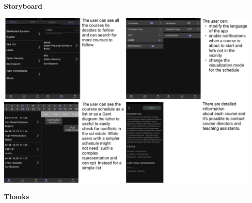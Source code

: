 \documentclass[t,aspectratio=1610]{beamer}
\begin{document}
{
\begin{frame}
\textbf{Storyboard} \\

\centerline{\includegraphics[scale=0.13]{storyboard.jpg}}
\end{frame}
}

{

\begin{frame}
\textbf{Thanks} \\

\end{frame}
}
\end{document}
